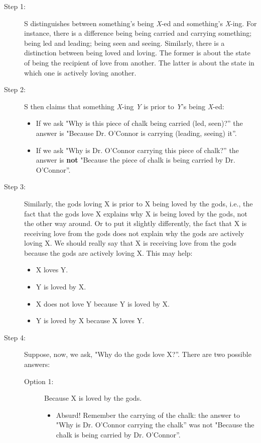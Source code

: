 \documentclass[oneside]{article}
\begin{document}
\begin{description}
\item[Step 1:] S distinguishes between something's being \emph{X}-ed and something's \emph{X}-ing. For instance, there is a difference being being carried and carrying something; being led and leading; being seen and seeing. Similarly, there is a distinction between being loved and loving. The former is about the state of being the recipient of love from another. The latter is about the state in which one is actively loving another.
\item[Step 2:] S then claims that something \emph{X}-ing \emph{Y} is prior to \emph{Y}'s being \emph{X}-ed:
\begin{itemize}
\item If we ask "Why is this piece of chalk being carried (led, seen)?'' the answer is "Because Dr. O'Connor is carrying (leading, seeing) it''.
\item If we ask "Why is Dr.  O'Connor carrying this piece of chalk?'' the answer is \textbf{not} "Because the piece of chalk is being carried by Dr. O'Connor''.
\end{itemize}
\item[Step 3:] Similarly, the gods loving X is prior to X being loved by the gods, i.e., the fact that the gods love X explains why X is being loved by the gods, not the other way around. Or to put it slightly differently, the fact that X is receiving love from the gods does not explain why the gods are actively loving X. We should really say that X is receiving love from the gods because the gods are actively loving X. This may help: 
\begin{itemize}
\item X loves Y.
\item Y is loved by X. 
\item X does not love Y because Y is loved by X.
\item Y is loved by X because X loves Y.
\end{itemize}
\item[Step 4:] Suppose, now, we ask, "Why do the gods love X?''. There are two possible answers:
\begin{description}
\item[Option 1:] Because X is loved by the gods. 
\begin{itemize}
\item Absurd! Remember the carrying of the chalk: the answer to "Why is Dr. O'Connor carrying the chalk'' was not "Because the chalk is being carried by Dr. O'Connor''.

\end{itemize}
\end{description}
\end{description}
\end{document}
